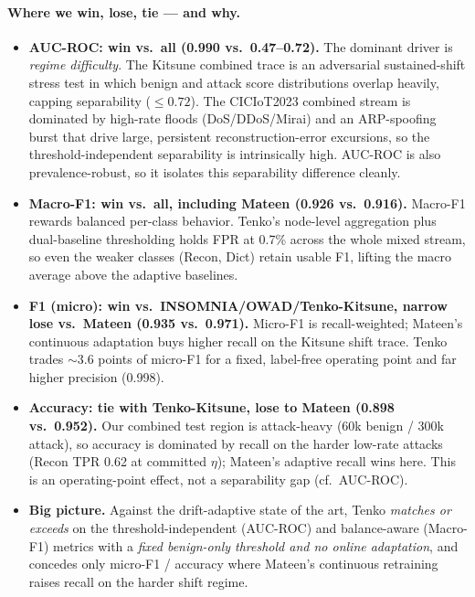 \documentclass[10pt]{article}
\begin{document}
\paragraph{Where we win, lose, tie --- and why.}
\begin{itemize}
\item \textbf{AUC-ROC: win vs.\ all (0.990 vs.\ 0.47--0.72).} The dominant driver is
\emph{regime difficulty}. The Kitsune combined trace is an adversarial sustained-shift stress
test in which benign and attack score distributions overlap heavily, capping separability
($\le 0.72$). The CICIoT2023 combined stream is dominated by high-rate floods (DoS/DDoS/Mirai)
and an ARP-spoofing burst that drive large, persistent reconstruction-error excursions, so the
threshold-independent separability is intrinsically high. AUC-ROC is also prevalence-robust,
so it isolates this separability difference cleanly.
\item \textbf{Macro-F1: win vs.\ all, including Mateen (0.926 vs.\ 0.916).} Macro-F1 rewards
balanced per-class behavior. Tenko's node-level aggregation plus dual-baseline thresholding
holds FPR at 0.7\% across the whole mixed stream, so even the weaker classes (Recon, Dict)
retain usable F1, lifting the macro average above the adaptive baselines.
\item \textbf{F1 (micro): win vs.\ INSOMNIA/OWAD/Tenko-Kitsune, narrow lose vs.\ Mateen
(0.935 vs.\ 0.971).} Micro-F1 is recall-weighted; Mateen's continuous adaptation buys higher
recall on the Kitsune shift trace. Tenko trades $\sim$3.6 points of micro-F1 for a fixed,
label-free operating point and far higher precision (0.998).
\item \textbf{Accuracy: tie with Tenko-Kitsune, lose to Mateen (0.898 vs.\ 0.952).} Our
combined test region is attack-heavy (60k benign / 300k attack), so accuracy is dominated by
recall on the harder low-rate attacks (Recon TPR 0.62 at committed $\eta$); Mateen's adaptive
recall wins here. This is an operating-point effect, not a separability gap (cf.\ AUC-ROC).
\item \textbf{Big picture.} Against the drift-adaptive state of the art, Tenko \emph{matches
or exceeds} on the threshold-independent (AUC-ROC) and balance-aware (Macro-F1) metrics with a
\emph{fixed benign-only threshold and no online adaptation}, and concedes only micro-F1 /
accuracy where Mateen's continuous retraining raises recall on the harder shift regime.
\end{itemize}

\end{document}
